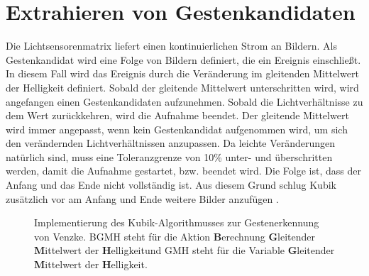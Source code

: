 \section{Extrahieren von Gestenkandidaten}
\label{sec:gesture_extraction}
Die Lichtsensorenmatrix liefert einen kontinuierlichen Strom an Bildern. Als Gestenkandidat wird eine Folge von Bildern definiert, die
ein Ereignis einschließt. In diesem Fall wird das Ereignis durch die Veränderung im gleitenden Mittelwert der Helligkeit definiert. Sobald der gleitende Mittelwert unterschritten wird, wird angefangen einen
Gestenkandidaten aufzunehmen. Sobald die Lichtverhältnisse zu dem Wert zurückkehren, wird die Aufnahme beendet. Der gleitende Mittelwert wird immer angepasst, wenn kein Gestenkandidat aufgenommen wird, um
sich den verändernden Lichtverhältnissen anzupassen. Da leichte Veränderungen natürlich sind, muss eine Toleranzgrenze von 10\% unter- und überschritten werden, damit die Aufnahme gestartet, bzw. beendet wird.
Die Folge ist, dass der Anfang und das Ende nicht vollständig ist. Aus diesem Grund schlug Kubik zusätzlich vor am Anfang und Ende weitere Bilder anzufügen \cite{kubikThesis}.
\begin{figure}
    \usetikzlibrary{arrows,automata,positioning}
    \centering
    \caption{Implementierung des Kubik-Algorithmusses zur Gestenerkennung von Venzke. BGMH steht für die Aktion \glqq \textbf{B}erechnung \textbf{G}leitender \textbf{M}ittelwert der \textbf{H}elligkeit\grqq und GMH steht für die Variable \glqq \textbf{G}leitender \textbf{M}ittelwert der \textbf{H}elligkeit\grqq.}
    \label{fig:venzkeAlgoImpl}
\end{figure}

